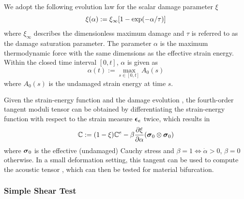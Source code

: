 \documentclass[12pt]{article}
\numberwithin{equation}{section}
\begin{document}
We adopt the following evolution law for the scalar damage parameter $
\xi$ \cite{Holzapfel:2000}
\begin{equation}\label{eq:iso-xi}
  \xi(\alpha) := \xi_{\infty} [ 1- {\rm exp}(-\alpha / \tau)]
\end{equation}
where $\xi_{\infty}$ describes the dimensionless maximum damage and
$\tau$ is referred to as the damage saturation parameter. The
parameter $\alpha$ is the maximum thermodynamic force
\cite{Holzapfel:2000} with the same dimensions as the effective strain
energy. Within the closed time interval $[0,t]$, $\alpha$ is given as
\begin{equation}\label{eq:alpha}
  \alpha(t) := \max_{s\in [0,t]}A_0(s)
\end{equation}
where $A_0(s)$ is the undamaged strain energy at time $s$.

Given the strain-energy function  and the damage
evolution , the fourth-order tangent moduli tensor can
be obtained by differentiating the strain-energy function with respect
to the strain measure ${\boldsymbol{\epsilon}}_e$ twice, which results in
\begin{equation}
  \mathbb{C} := (1-\xi)\mathbb{C}^e
    - \beta \frac{\partial\xi}{\partial\alpha}
    ({\boldsymbol{\sigma}}_0\otimes{\boldsymbol{\sigma}}_0)
\end{equation}
where ${\boldsymbol{\sigma}}_0$ is the effective (undamaged) Cauchy stress and
$\beta = 1 \iff \dot{\alpha} > 0$, $\beta=0$ otherwise. In a small
deformation setting, this tangent can be used to compute the acoustic
tensor , which can then be tested for
material bifurcation.

\subsubsection{Simple Shear Test}
\end{document}
